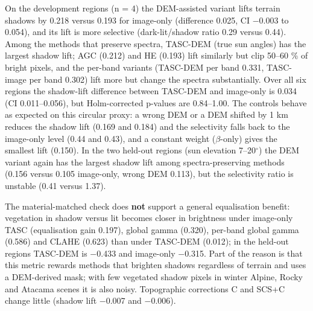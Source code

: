 \documentclass[conference]{IEEEtran}
\begin{document}
On the development regions (n = 4) the DEM-assisted variant lifts terrain shadows by 0.218 versus 0.193 for image-only (difference 0.025, CI $-$0.003 to 0.054), and its lift is more selective (dark-lit/shadow ratio 0.29 versus 0.44). Among the methods that preserve spectra, TASC-DEM (true sun angles) has the largest shadow lift; AGC (0.212) and HE (0.193) lift similarly but clip 50--60 \% of bright pixels, and the per-band variants (TASC-DEM per band 0.331, TASC-image per band 0.302) lift more but change the spectra substantially. Over all six regions the shadow-lift difference between TASC-DEM and image-only is 0.034 (CI 0.011--0.056), but Holm-corrected p-values are 0.84--1.00. The controls behave as expected on this circular proxy: a wrong DEM or a DEM shifted by 1 km reduces the shadow lift (0.169 and 0.184) and the selectivity falls back to the image-only level (0.44 and 0.43), and a constant weight ($\beta$-only) gives the smallest lift (0.150). In the two held-out regions (sun elevation 7--20$^{\circ}$) the DEM variant again has the largest shadow lift among spectra-preserving methods (0.156 versus 0.105 image-only, wrong DEM 0.113), but the selectivity ratio is unstable (0.41 versus 1.37).

The material-matched check does \textbf{not} support a general equalisation benefit: vegetation in shadow versus lit becomes closer in brightness under image-only TASC (equalisation gain 0.197), global gamma (0.320), per-band global gamma (0.586) and CLAHE (0.623) than under TASC-DEM (0.012); in the held-out regions TASC-DEM is $-$0.433 and image-only $-$0.315. Part of the reason is that this metric rewards methods that brighten shadows regardless of terrain and uses a DEM-derived mask; with few vegetated shadow pixels in winter Alpine, Rocky and Atacama scenes it is also noisy. Topographic corrections C and SCS+C change little (shadow lift $-$0.007 and $-$0.006).
\end{document}
